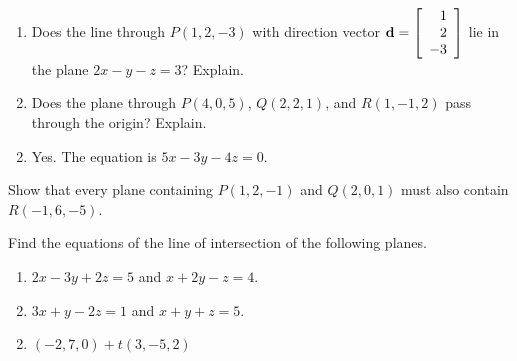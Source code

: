 \begin{multicols}{2}
\begin{ex}
\begin{sol}
\begin{enumerate}[label={\alph*.}]
\end{enumerate}
\end{sol}
\end{ex}

\begin{ex}
\begin{enumerate}[label={\alph*.}]
\item Does the line through $P(1, 2, -3)$ with direction vector $\textbf{d} = \left[
\begin{array}{r}
1\\
2\\
-3
\end{array}
\right]$ lie in the plane $2x - y - z = 3$? Explain.

\item Does the plane through $P(4, 0, 5)$, $Q(2, 2, 1)$, and $R(1, -1, 2)$ pass through the origin? Explain.

\end{enumerate}
\begin{sol}
\begin{enumerate}[label={\alph*.}]
\setcounter{enumi}{1}
\item  Yes. The equation is $5x -3y - 4z = 0$.

\end{enumerate}
\end{sol}
\end{ex}

\begin{ex}
Show that every plane containing $P(1, 2, -1)$ and $Q(2, 0, 1)$ must also contain $R(-1, 6, -5)$.
\end{ex}

\begin{ex}
Find the equations of the line of intersection of the following planes.


\begin{enumerate}[label={\alph*.}]
\item $2x -3y + 2z = 5$ and $x + 2y - z = 4$.

\item $3x + y -2z = 1$ and $x + y + z = 5$.

\end{enumerate}
\begin{sol}
\begin{enumerate}[label={\alph*.}]
\setcounter{enumi}{1}
\item  $(-2, 7, 0) + t(3, -5, 2)$

\end{enumerate}
\end{sol}
\end{ex}


\end{multicols}
